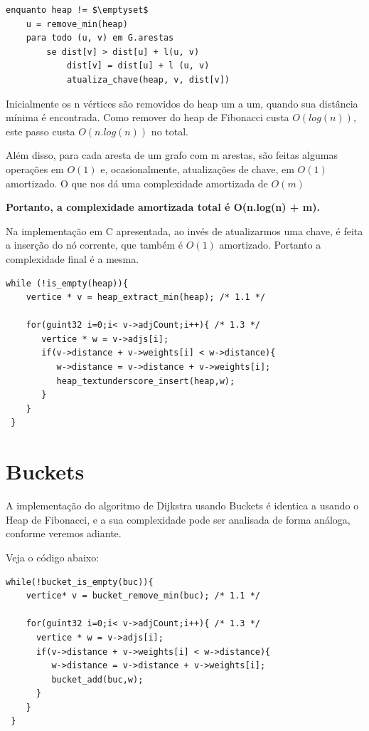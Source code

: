 \documentclass[
	12pt,				%
	oneside,			%
	a4paper,			%
	english,			%
	french,				%
	spanish,			%
	brazil,				%
	]{abntex2}
\begin{document}
\begin{lstlisting}[caption=parte do Pseudo-código do algoritmo de Dijkstra, mathescape=true, label=dijkstra.pseudo.heap]
enquanto heap != $\emptyset$
    u = remove_min(heap)
    para todo (u, v) em G.arestas
        se dist[v] > dist[u] + l(u, v)
            dist[v] = dist[u] + l (u, v)
            atualiza_chave(heap, v, dist[v])
\end{lstlisting}

Inicialmente os n vértices são removidos do heap um a um, quando sua distância mínima é encontrada. Como remover do heap de Fibonacci custa $O(log(n))$, este passo custa $O(n.log(n))$ no total.

Além disso, para cada aresta de um grafo com m arestas, são feitas algumas operações em $O(1)$ e, ocasionalmente, atualizações de chave, em $O(1)$ amortizado. O que nos dá uma complexidade amortizada de $O(m)$

\textbf{Portanto, a complexidade amortizada total é O(n.log(n) + m).}

Na implementação em C apresentada, ao invés de atualizarmos uma chave, é feita a inserção do nó corrente, que também é $O(1)$ amortizado. Portanto a complexidade final é a mesma.

\begin{lstlisting}[caption=Corpo do algortimo Dijkstra com uso da heap de fibonacci, label=dijkstra.heap]
 while (!is_empty(heap)){
    vertice * v = heap_extract_min(heap); /* 1.1 */

    for(guint32 i=0;i< v->adjCount;i++){ /* 1.3 */
       vertice * w = v->adjs[i];
       if(v->distance + v->weights[i] < w->distance){
          w->distance = v->distance + v->weights[i];
          heap_textunderscore_insert(heap,w);
       } 
    }
 }   
\end{lstlisting}



\section{Buckets}

A implementação do algoritmo de Dijkstra usando Buckets é identica a usando o Heap de Fibonacci, e a sua complexidade pode ser analisada de forma análoga, conforme veremos adiante.

Veja o código abaixo:

\begin{lstlisting}[caption=Corpo do algortimo Dijkstra com uso de buckets, label=dijkstra.buckets]
 while(!bucket_is_empty(buc)){
    vertice* v = bucket_remove_min(buc); /* 1.1 */
   
    for(guint32 i=0;i< v->adjCount;i++){ /* 1.3 */
      vertice * w = v->adjs[i];
      if(v->distance + v->weights[i] < w->distance){
         w->distance = v->distance + v->weights[i];   
         bucket_add(buc,w);
      } 
    }
 }   
\end{lstlisting}
\end{document}
